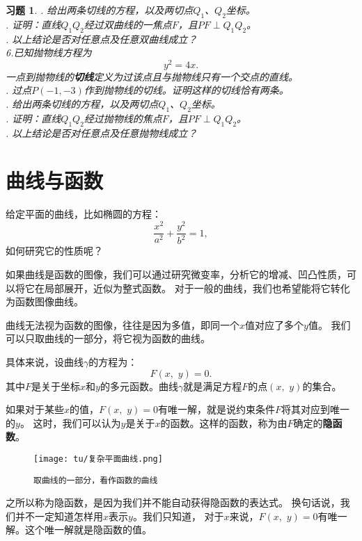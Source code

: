\documentclass[12pt,UTF8]{ctexbook}
\theoremstyle{definition}
\theoremstyle{plain}
\newtheorem{xt}{习题}[section]
\begin{document}
\begin{xt}
    . 给出两条切线的方程，以及两切点$Q_1$、$Q_2$坐标。\\
    . 证明：直线$Q_1Q_2$经过双曲线的一焦点$F$，且$PF\perp Q_1Q_2$。\\
    . 以上结论是否对任意点及任意双曲线成立？\\
    \indent 6.已知抛物线方程为
    $$ y^2 = 4x.$$ 
    一点到抛物线的\textbf{切线}定义为过该点且与抛物线只有一个交点的直线。\\
    . 过点$P(-1, -3)$作到抛物线的切线。证明这样的切线恰有两条。\\
    . 给出两条切线的方程，以及两切点$Q_1$、$Q_2$坐标。\\
    . 证明：直线$Q_1Q_2$经过抛物线的焦点$F$，且$PF\perp Q_1Q_2$。\\
    . 以上结论是否对任意点及任意抛物线成立？\\
    
\end{xt}

\section{曲线与函数}

给定平面的曲线，比如椭圆的方程：
$$ \frac{x^2}{a^2} + \frac{y^2}{b^2} = 1,$$
如何研究它的性质呢？

如果曲线是函数的图像，我们可以通过研究微变率，分析它的增减、凹凸性质，可以将它在局部展开，近似为整式函数。
对于一般的曲线，我们也希望能将它转化为函数图像曲线。

曲线无法视为函数的图像，往往是因为多值，即同一个$x$值对应了多个$y$值。
我们可以只取曲线的一部分，将它视为函数的曲线。

具体来说，设曲线$\gamma$的方程为：
$$ F(x, \,\, y) = 0. $$
其中$F$是关于坐标$x$和$y$的多元函数。曲线$\gamma$就是满足方程$F$的点$(x,\,\,y)$的集合。

如果对于某些$x$的值，$F(x, \,\,y) = 0$有唯一解，就是说约束条件$F$将其对应到唯一的$y$。
这时，我们可以认为$y$是关于$x$的函数。这样的函数，称为由$F$确定的\textbf{隐函数}。

\begin{wrapfigure}[10]{r}{0.52\textwidth} %
    \vspace{-30pt}
    \flushright
    \texttt{[image: tu/复杂平面曲线.png]}
    \caption*{\texttt{取曲线的一部分，看作函数的曲线}}
\end{wrapfigure}

之所以称为隐函数，是因为我们并不能自动获得隐函数的表达式。
换句话说，我们并不一定知道怎样用$x$表示$y$。我们只知道，
对于$x$来说，$F(x, \,\,y) = 0$有唯一解。这个唯一解就是隐函数的值。
\end{document}
